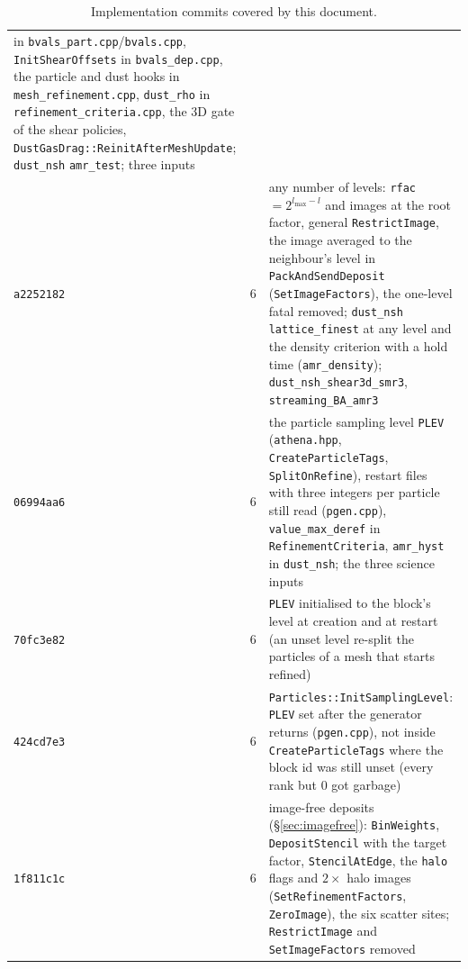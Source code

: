 \documentclass[11pt]{article}
\newcommand{\code}[1]{\texttt{#1}}
\newcommand{\file}[1]{\texttt{\small #1}}
\newcommand{\fn}[1]{\texttt{\small #1}}
\begin{document}
\begin{table}[htb]
\begin{tabular}{@{}llp{9.4cm}@{}}
              in \file{bvals\_part.cpp}/\file{bvals.cpp}, \fn{InitShearOffsets} in
              \file{bvals\_dep.cpp}, the particle and dust hooks in
              \file{mesh\_refinement.cpp}, \code{dust\_rho} in
              \file{refinement\_criteria.cpp}, the 3D gate of the shear policies,
              \fn{DustGasDrag::ReinitAfterMeshUpdate}; \code{dust\_nsh} \code{amr\_test};
              three inputs \\
\code{a2252182} & 6 & any number of levels: \code{rfac} $= 2^{l_{\max}-l}$ and images at
              the root factor, general \fn{RestrictImage}, the image averaged to the
              neighbour's level in \fn{PackAndSendDeposit} (\fn{SetImageFactors}), the
              one-level fatal removed; \code{dust\_nsh} \code{lattice\_finest} at any
              level and the density criterion with a hold time (\code{amr\_density});
              \file{dust\_nsh\_shear3d\_smr3}, \file{streaming\_BA\_amr3} \\
\code{06994aa6} & 6 & the particle sampling level \code{PLEV} (\file{athena.hpp},
              \fn{CreateParticleTags}, \fn{SplitOnRefine}), restart files with three
              integers per particle still read (\file{pgen.cpp}),
              \code{value\_max\_deref} in \code{RefinementCriteria},
              \code{amr\_hyst} in \code{dust\_nsh}; the three science inputs \\
\code{70fc3e82} & 6 & \code{PLEV} initialised to the block's level at creation and at
              restart (an unset level re-split the particles of a mesh that starts
              refined) \\
\code{424cd7e3} & 6 & \fn{Particles::InitSamplingLevel}: \code{PLEV} set after the
              generator returns (\file{pgen.cpp}), not inside \fn{CreateParticleTags}
              where the block id was still unset (every rank but 0 got garbage) \\
\code{1f811c1c} & 6 & image-free deposits (\S\ref{sec:imagefree}):
              \fn{BinWeights}, \fn{DepositStencil} with the target factor,
              \fn{StencilAtEdge}, the \code{halo} flags and $2\times$ halo images
              (\fn{SetRefinementFactors}, \fn{ZeroImage}), the six scatter sites;
              \fn{RestrictImage} and \fn{SetImageFactors} removed \\
\bottomrule
\end{tabular}
\caption{Implementation commits covered by this document.}
\label{tab:commits}
\end{table}
\end{document}
